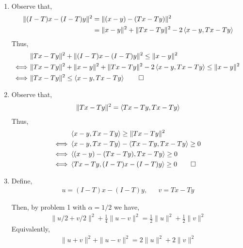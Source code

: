 \documentclass[10pt]{article}
\begin{document}
\begin{solution}[Solution]
\begin{enumerate}[label=(\alph*)]
    \item Observe that,
        \begin{align*}
            \| (I-T)x - (I-T)y \|^2 &= \| (x-y)-(Tx-Ty) \|^2
            \\&= \|x-y\|^2 + \|Tx - Ty\|^2 - 2 \left\langle x-y,Tx-Ty \right\rangle
        \end{align*}
        Thus,
        \begin{align*}
            & \|Tx - Ty\|^2 + \|(I-T) x - (I-T)y\|^2 \leq \|x-y\|^2
            \\ \Longleftrightarrow ~& 
            \| Tx - Ty \|^2 + \|x-y\|^2 + \|Tx - Ty\|^2 - 2 \ip{x-y,Tx-Ty} \leq \|x-y \|^2
            \\ \Longleftrightarrow ~& 
            \|Tx - Ty\|^2  \leq  \ip{x-y,Tx-Ty} \tag*{\qed}
        \end{align*}
        
    \item Observe that,
        \begin{align*}
            \| Tx-Ty \|^2 = \left\langle Tx-Ty,Tx-Ty \right\rangle
        \end{align*}
        Thus,
        \begin{align*}
            &\ip{x-y,Tx-Ty} \geq \|Tx-Ty\|^2
            \\ \Longleftrightarrow ~&
            \ip{x-y,Tx-Ty} - \ip{Tx-Ty,Tx-Ty} \geq 0
            \\ \Longleftrightarrow ~&
            \ip{(x-y) - (Tx-Ty),Tx-Ty} \geq 0
            \\ \Longleftrightarrow ~&
            \ip{Tx-Ty,(I-T)x - (I-T)y} \geq 0 \tag*{\qed}
        \end{align*}
        
    \item Define,
        \begin{align*}
            u = (I-T)x - (I-T)y, && v = Tx - Ty
        \end{align*}

        Then, by problem 1 with \( \alpha = 1/2 \) we have,
        \begin{align*}
            \| u/2+v/2 \|^2 + \frac{1}{4}\|u-v\|^2 = \frac{1}{2} \| u \|^2 + \frac{1}{2}\| v \|^2 
        \end{align*}
        Equivalently,
        \begin{align*}
            \| u+v \|^2 + \| u-v \|^2 = 2 \| u \|^2 + 2 \| v \|^2
        \end{align*}


\end{enumerate}
\end{solution}
\end{document}
